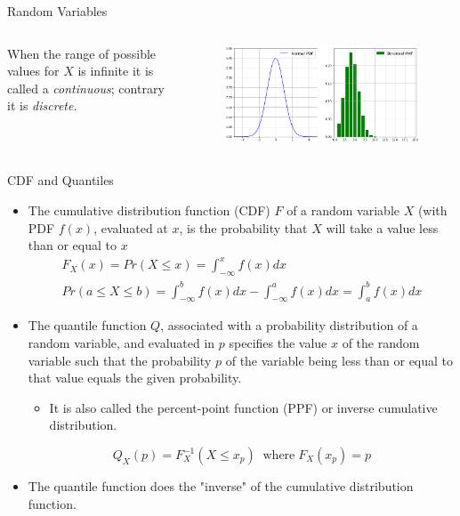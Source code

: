 \documentclass{beamer}
\begin{document}
\begin{frame}{Random Variables}
    \begin{columns}
    When the range of possible values for $X$ is infinite it is called a \emph{continuous}; contrary it is \emph{discrete}.
    \begin{figure}[h]
    \begin{center}
    \includegraphics[width=1.0\linewidth]{rv_pdf}
    \end{center}
    \end{figure}    
    \end{columns}
\end{frame}

\begin{frame}{CDF and Quantiles}
	\begin{itemize}
    \item The cumulative distribution function (CDF) $F$ of a random variable $X$ (with PDF $f(x)$, evaluated at $x$, is the probability that $X$ will take a value less than or equal to $x$
    \begin{equation*}
        \begin{gathered}
            F_X(x) = Pr(X\leq x) = \int_{-\infty}^{x} f(x)dx\\
            Pr(a \leq X\leq b) = \int_{-\infty}^{b} f(x)dx - \int_{-\infty}^{a} f(x)dx = \int_{a}^{b} f(x)dx
        \end{gathered}
    \end{equation*}
    
    \item The quantile function $Q$, associated with a probability distribution of a random variable, and evaluated in $p$ specifies the value $x$ of the random variable such that the probability $p$ of the variable being less than or equal to that value equals the given probability. 
    \begin{itemize}
        \item It is also called the percent-point function (PPF) or inverse cumulative distribution.
    \end{itemize}
    \begin{equation*}    
        Q_X(p) = F_X^{-1}(X \leq x_p)\;\;\textrm{where}\; F_X(x_p) = p
    \end{equation*}
    
    \item The quantile function does the "inverse" of the cumulative distribution function.
	\end{itemize}
\end{frame}
\end{document}
